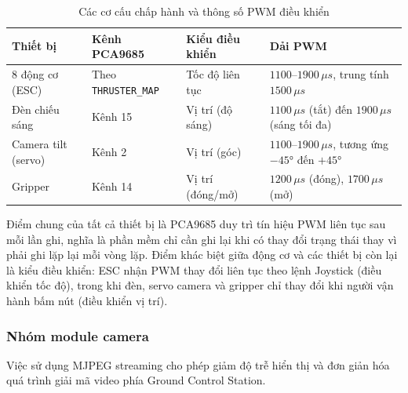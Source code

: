 \documentclass[../DoAn.tex]{subfiles}
\begin{document}
\begin{table}[H]

\centering

\renewcommand{\arraystretch}{1.3}

\begin{tabular}{|l|l|l|p{3cm}|}

\hline

\textbf{Thiết bị} & \textbf{Kênh PCA9685} & \textbf{Kiểu điều khiển} & \textbf{Dải PWM} \\

\hline

8 động cơ (ESC) & Theo \texttt{THRUSTER\_MAP} & Tốc độ liên tục &
$1100$--$1900\,\mu s$, trung tính $1500\,\mu s$ \\

\hline

Đèn chiếu sáng & Kênh 15 & Vị trí (độ sáng) &
$1100\,\mu s$ (tắt) đến $1900\,\mu s$ (sáng tối đa) \\

\hline

Camera tilt (servo) & Kênh 2 & Vị trí (góc) &
$1100$--$1900\,\mu s$, tương ứng $-45°$ đến $+45°$ \\

\hline

Gripper & Kênh 14 & Vị trí (đóng/mở) &
$1200\,\mu s$ (đóng), $1700\,\mu s$ (mở) \\

\hline

\end{tabular}

\caption{Các cơ cấu chấp hành và thông số PWM điều khiển}

\label{tab:actuator_modules}

\end{table}

Điểm chung của tất cả thiết bị là PCA9685 duy trì tín hiệu PWM liên
tục sau mỗi lần ghi, nghĩa là phần mềm chỉ cần ghi lại khi có thay
đổi trạng thái thay vì phải ghi lặp lại mỗi vòng lặp. Điểm khác biệt
giữa động cơ và các thiết bị còn lại là kiểu điều khiển: ESC nhận PWM
thay đổi liên tục theo lệnh Joystick (điều khiển tốc độ), trong khi
đèn, servo camera và gripper chỉ thay đổi khi người vận hành bấm nút
(điều khiển vị trí).

\subsubsection{Nhóm module camera}

Việc sử dụng MJPEG streaming cho phép giảm độ trễ hiển thị và đơn giản
hóa quá trình giải mã video phía Ground Control Station.
\end{document}
